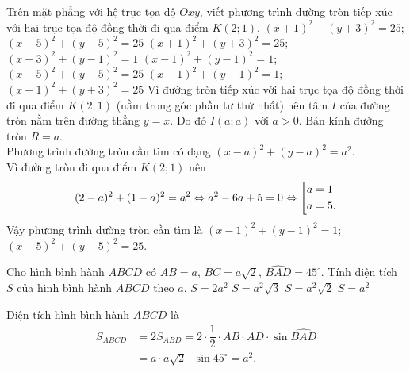 \begin{ex}%
 Trên mặt phẳng với hệ trục tọa độ $Oxy$, viết phương trình đường tròn tiếp xúc với hai trục tọa độ đồng thời đi qua điểm $K(2;1)$.
 \choice
  {$(x+1)^2 + (y+3)^2 = 25$; $(x-5)^2 + (y-5)^2 = 25$}
  {$(x+1)^2 + (y+3)^2 = 25$; $(x-3)^2 + (y-1)^2 = 1$}
  {\True $(x-1)^2 + (y-1)^2 = 1$; $(x-5)^2 + (y-5)^2 = 25$}
  {$(x-1)^2 + (y-1)^2 = 1$; $(x+1)^2 + (y+3)^2 = 25$}
 \loigiai
 {
 Vì đường tròn tiếp xúc với hai trục tọa độ đồng thời đi qua điểm $K(2;1)$ (nằm trong góc phần tư thứ nhất) nên tâm $I$ của đường tròn nằm trên đường thẳng $y = x$. Do đó $I(a;a)$ với $a > 0$. Bán kính đường tròn $R = a$.\\
 Phương trình đường tròn cần tìm có dạng $(x - a)^2 + (y - a)^2 = a^2$.\\
 Vì đường tròn đi qua điểm $K(2;1)$ nên
 $$(2-a)^2 + (1-a)^2 = a^2 \Leftrightarrow a^2 - 6a + 5 = 0 \Leftrightarrow \left[\begin{aligned}& a = 1 \\& a = 5.\end{aligned}\right.$$
 Vậy phương trình đường tròn cần tìm là $(x-1)^2 + (y-1)^2 = 1$; $(x-5)^2 + (y-5)^2 = 25$.
 }
\end{ex}


\begin{ex}%
 Cho hình bình hành $ABCD$ có $AB = a$, $BC = a \sqrt{2}$, $\widehat{BAD} = 45^\circ$. Tính diện tích $S$ của hình bình hành $ABCD$ theo $a$.
 \choice
  {$S = 2a^2$}
  {$S = a^2 \sqrt{3}$}
  {$S = a^2 \sqrt{2}$}
  {\True $S = a^2$}
 \loigiai
 {
 \immini
 {
 Diện tích hình bình hành $ABCD$ là
 \begin{align*}
  S_{ABCD} & = 2 S_{ABD} = 2 \cdot \dfrac{1}{2} \cdot AB \cdot AD \cdot \sin \widehat{BAD} \\
  & = a \cdot a\sqrt{2} \cdot \sin 45^\circ = a^2.
 \end{align*}
 }
 {
 }
 }
\end{ex}





